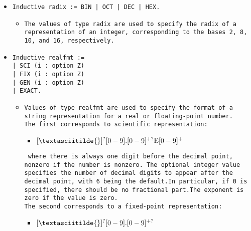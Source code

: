 \documentclass[11pt]{report}
\begin{document}
\begin{itemize}
\item  \texttt{Inductive radix := BIN | OCT | DEC | HEX.}

\begin{itemize}
\item  \texttt{The values of type radix are used to specify the radix of a representation of an integer, corresponding to the bases 2, 8, 10, and 16, respectively.}
\end{itemize}

\item  \texttt{Inductive realfmt :=\\| SCI (i : option Z)\\ | FIX (i : option Z)\\ | GEN (i : option Z)\\ | EXACT.}

\begin{itemize}

\item  \begin{flushleft} \texttt{Values of type realfmt are used to specify the format of a string representation for a real or floating-point number.\\ 
\coqdocemptyline
The first corresponds to scientific representation:}

\begin{itemize}
\item $[ \textasciitilde{} ]^?[0-9].[0-9]^{+?}\text{E}[0-9]^+$
\end{itemize}

\texttt{ where there is always one digit before the decimal point, nonzero if the number is nonzero. The optional integer value specifies the number of decimal digits to appear after the decimal point, with 6 being the default.In particular, if 0 is specified, there should be no fractional part.The exponent is zero if the value is zero.\\
\coqdocemptyline
The second corresponds to a fixed-point representation:}
\begin{itemize}
\item $[ \textasciitilde{} ]^?[0-9].[0-9]^{+?}$
\end{itemize}


\end{flushleft}
\end{itemize}
\end{itemize}
\end{document}
